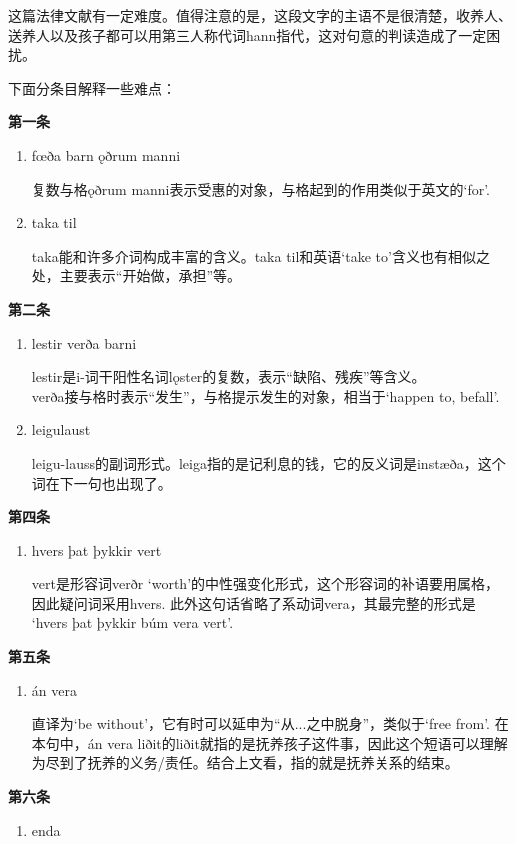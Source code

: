 \begin{grammar*}{}
    这篇法律文献有一定难度。值得注意的是，这段文字的主语不是很清楚，收养人、送养人以及孩子都可以用第三人称代词hann指代，这对句意的判读造成了一定困扰。

    下面分条目解释一些难点：

    \textbf{第一条}
    \begin{enumerate}
        \item fœða barn ǫðrum manni

              复数与格ǫðrum manni表示受惠的对象，与格起到的作用类似于英文的`for'.

        \item taka til

              taka能和许多介词构成丰富的含义。taka til和英语`take to'含义也有相似之处，主要表示“开始做，承担”等。
    \end{enumerate}

    \textbf{第二条}
    \begin{enumerate}
        \item lestir verða barni

              lestir是i-词干阳性名词l\k{o}ster的复数，表示“缺陷、残疾”等含义。\\verða接与格时表示“发生”，与格提示发生的对象，相当于`happen to, befall'.

        \item leigulaust

              leigu-lauss的副词形式。leiga指的是记利息的钱，它的反义词是instæða，这个词在下一句也出现了。

    \end{enumerate}

    \textbf{第四条}
    \begin{enumerate}
        \item hvers þat þykkir vert

              vert是形容词verðr `worth'的中性强变化形式，这个形容词的补语要用属格，因此疑问词采用hvers. 此外这句话省略了系动词vera，其最完整的形式是
              `hvers þat þykkir búm vera vert'.
    \end{enumerate}
    \textbf{第五条}
    \begin{enumerate}
        \item án vera

              直译为`be without'，它有时可以延申为“从...之中脱身”，类似于`free from'. 在本句中，án vera liðit的liðit就指的是抚养孩子这件事，因此这个短语可以理解为尽到了抚养的义务/责任。结合上文看，指的就是抚养关系的结束。
    \end{enumerate}
    \textbf{第六条}
    \begin{enumerate}
        \item enda


\end{enumerate}
\end{grammar*}
